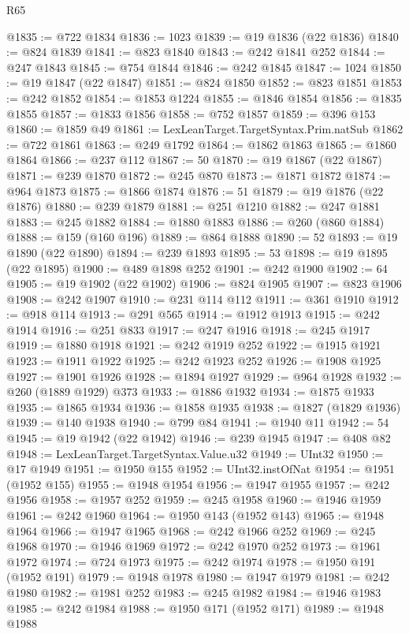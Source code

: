 \begin{lexlean}{R65}
\begin{coremodule}
{@1835 := @722 @1834
@1836 := 1023
@1839 := @19 @1836 (@22 @1836)
@1840 := @824 @1839
@1841 := @823 @1840
@1843 := @242 @1841 @252
@1844 := @247 @1843
@1845 := @754 @1844
@1846 := @242 @1845
@1847 := 1024
@1850 := @19 @1847 (@22 @1847)
@1851 := @824 @1850
@1852 := @823 @1851
@1853 := @242 @1852
@1854 := @1853 @1224
@1855 := @1846 @1854
@1856 := @1835 @1855
@1857 := @1833 @1856
@1858 := @752 @1857
@1859 := @396 @153
@1860 := @1859 @49
@1861 := LexLeanTarget.TargetSyntax.Prim.natSub
@1862 := @722 @1861
@1863 := @249 @1792
@1864 := @1862 @1863
@1865 := @1860 @1864
@1866 := @237 @112
@1867 := 50
@1870 := @19 @1867 (@22 @1867)
@1871 := @239 @1870
@1872 := @245 @870
@1873 := @1871 @1872
@1874 := @964 @1873
@1875 := @1866 @1874
@1876 := 51
@1879 := @19 @1876 (@22 @1876)
@1880 := @239 @1879
@1881 := @251 @1210
@1882 := @247 @1881
@1883 := @245 @1882
@1884 := @1880 @1883
@1886 := @260 (@860 @1884)
@1888 := @159 (@160 @196)
@1889 := @864 @1888
@1890 := 52
@1893 := @19 @1890 (@22 @1890)
@1894 := @239 @1893
@1895 := 53
@1898 := @19 @1895 (@22 @1895)
@1900 := @489 @1898 @252
@1901 := @242 @1900
@1902 := 64
@1905 := @19 @1902 (@22 @1902)
@1906 := @824 @1905
@1907 := @823 @1906
@1908 := @242 @1907
@1910 := @231 @114 @112
@1911 := @361 @1910
@1912 := @918 @114
@1913 := @291 @565
@1914 := @1912 @1913
@1915 := @242 @1914
@1916 := @251 @833
@1917 := @247 @1916
@1918 := @245 @1917
@1919 := @1880 @1918
@1921 := @242 @1919 @252
@1922 := @1915 @1921
@1923 := @1911 @1922
@1925 := @242 @1923 @252
@1926 := @1908 @1925
@1927 := @1901 @1926
@1928 := @1894 @1927
@1929 := @964 @1928
@1932 := @260 (@1889 @1929) @373
@1933 := @1886 @1932
@1934 := @1875 @1933
@1935 := @1865 @1934
@1936 := @1858 @1935
@1938 := @1827 (@1829 @1936)
@1939 := @140 @1938
@1940 := @799 @84
@1941 := @1940 @11
@1942 := 54
@1945 := @19 @1942 (@22 @1942)
@1946 := @239 @1945
@1947 := @408 @82
@1948 := LexLeanTarget.TargetSyntax.Value.u32
@1949 := UInt32
@1950 := @17 @1949
@1951 := @1950 @155
@1952 := UInt32.instOfNat
@1954 := @1951 (@1952 @155)
@1955 := @1948 @1954
@1956 := @1947 @1955
@1957 := @242 @1956
@1958 := @1957 @252
@1959 := @245 @1958
@1960 := @1946 @1959
@1961 := @242 @1960
@1964 := @1950 @143 (@1952 @143)
@1965 := @1948 @1964
@1966 := @1947 @1965
@1968 := @242 @1966 @252
@1969 := @245 @1968
@1970 := @1946 @1969
@1972 := @242 @1970 @252
@1973 := @1961 @1972
@1974 := @724 @1973
@1975 := @242 @1974
@1978 := @1950 @191 (@1952 @191)
@1979 := @1948 @1978
@1980 := @1947 @1979
@1981 := @242 @1980
@1982 := @1981 @252
@1983 := @245 @1982
@1984 := @1946 @1983
@1985 := @242 @1984
@1988 := @1950 @171 (@1952 @171)
@1989 := @1948 @1988
}
\end{coremodule}
\end{lexlean}
